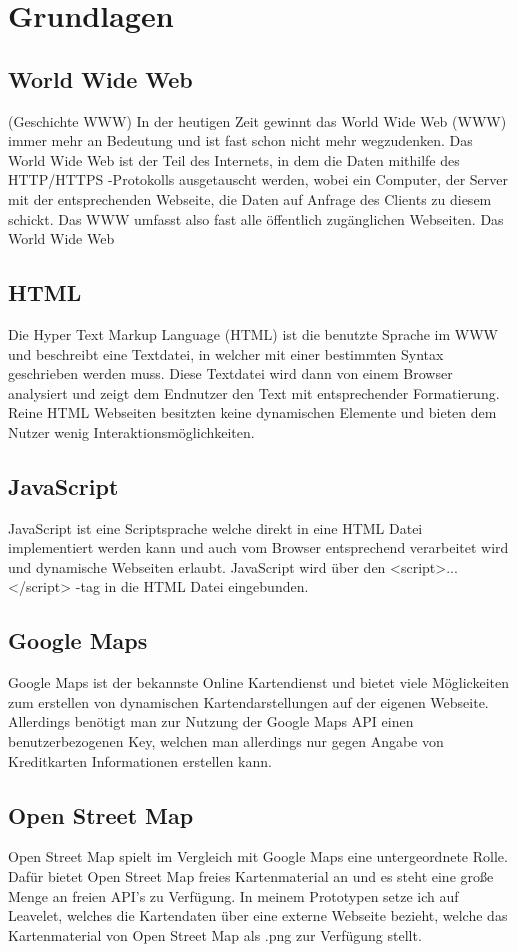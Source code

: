 \documentclass[a4paper, twoside, 12pt]{scrreprt}
\begin{document}
\section{Grundlagen}
\subsection{World Wide Web}
(Geschichte WWW)
In der heutigen Zeit gewinnt das World Wide Web (WWW) immer mehr an Bedeutung und ist fast schon nicht mehr wegzudenken.
Das World Wide Web ist der Teil des Internets, in dem die Daten mithilfe des HTTP/HTTPS -Protokolls ausgetauscht werden, wobei ein Computer, der Server mit der entsprechenden Webseite, die Daten auf Anfrage des Clients zu diesem schickt.
Das WWW umfasst also fast alle öffentlich zugänglichen Webseiten.
Das World Wide Web~\citep{www}
\subsection{HTML}
Die Hyper Text Markup Language (HTML) ist die benutzte Sprache im WWW und beschreibt eine Textdatei, in welcher mit einer bestimmten Syntax geschrieben werden muss.
Diese Textdatei wird dann von einem Browser analysiert und zeigt dem Endnutzer den Text mit entsprechender Formatierung.
Reine HTML Webseiten besitzten keine dynamischen Elemente und bieten dem Nutzer wenig Interaktionsmöglichkeiten.
\subsection{JavaScript}
JavaScript ist eine Scriptsprache welche direkt in eine HTML Datei implementiert werden kann und auch vom Browser entsprechend verarbeitet wird und dynamische Webseiten erlaubt.
JavaScript wird über den <script>...</script> -tag in die HTML Datei eingebunden.
\subsection{Google Maps}
Google Maps ist der bekannste Online Kartendienst und bietet viele Möglickeiten zum erstellen von dynamischen Kartendarstellungen auf der eigenen Webseite.
Allerdings benötigt man zur Nutzung der Google Maps API einen benutzerbezogenen Key, welchen man allerdings nur gegen Angabe von Kreditkarten Informationen erstellen kann.
\subsection{Open Street Map}
Open Street Map spielt im Vergleich mit Google Maps eine untergeordnete Rolle.
Dafür bietet Open Street Map freies Kartenmaterial an und es steht eine große Menge an freien API's zu Verfügung.
In meinem Prototypen setze ich auf Leavelet, welches die Kartendaten über eine externe Webseite bezieht, welche das Kartenmaterial von Open Street Map als .png zur Verfügung stellt.
\end{document}
